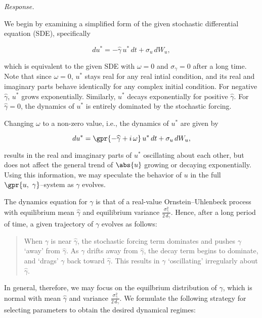 \textit{Response.} 

We begin by examining a simplified form of the given stochastic differential equation (SDE), specifically

\begin{equation}
	du^{*} = -\widehat{\gamma}\,u^{*}\,dt + \sigma_u\,dW_u,
\end{equation}

which is equivalent to the given SDE with $\omega = 0$ and $\sigma_{\gamma} = 0$ after a long time. Note that since $\omega = 0$, $u^{*}$ stays real for any real intial condition, and its real and imaginary parts behave identically for any complex initial condition. For negative $\widehat{\gamma}$, $u^{*}$ grows exponentially. Similarly, $u^{*}$ decays exponentially for positive $\widehat{\gamma}$. For $\widehat{\gamma} = 0$, the dynamics of $u^{*}$ is entirely dominated by the stochastic forcing.

Changing $\omega$ to a non-zero value, i.e., the dynamics of $u^{*}$ are given by

\begin{equation}
	du^{*} = \gpr{-\widehat{\gamma} + i\,\omega}\,u^{*}\,dt + \sigma_u\,dW_u,
\end{equation}

results in the real and imaginary parts of $u^{*}$ oscillating about each other, but does not affect the general trend of $\abs{u}$ growing or decaying exponentially. Using this information, we may speculate the behavior of $u$ in the full $\gpr{u,\ \gamma}$--system as $\gamma$ evolves.

The dynamics equation for $\gamma$ is that of a real-value Ornstein--Uhlenbeck process with equilibrium mean $\widehat{\gamma}$ and equilibrium variance $\frac{\sigma_{\gamma}^2}{2\,d_{\gamma}}$. Hence, after a long period of time, a given trajectory of $\gamma$ evolves as follows:

\begin{quote}
	When $\gamma$ is near $\widehat{\gamma}$, the stochastic forcing term dominates and pushes $\gamma$ `away' from $\widehat{\gamma}$. As $\gamma$ drifts away from $\widehat{\gamma}$, the decay term begins to dominate, and `drags' $\gamma$ back toward $\widehat{\gamma}$. This results in $\gamma$ `oscillating' irregularly about $\widehat{\gamma}$.
\end{quote}

In general, therefore, we may focus on the equilbrium distribution of $\gamma$, which is normal with mean $\widehat{\gamma}$ and variance $\frac{\sigma_{\gamma}^2}{2\,d_{\gamma}}$. We formulate the following strategy for selecting parameters to obtain the desired dynamical regimes:

